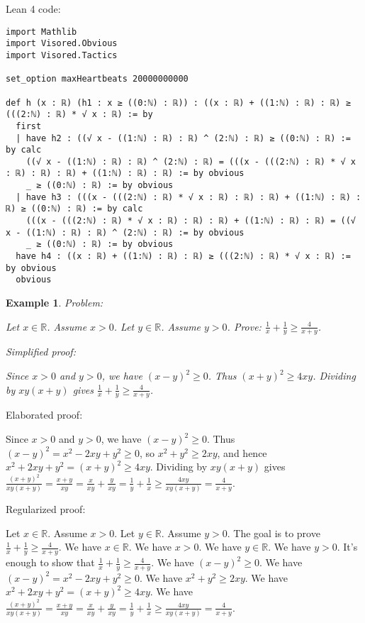 \documentclass{article}
\newtheorem{example}{Example}
\begin{document}
Lean 4 code:
\begin{tcolorbox}[colback=white!10, width=\linewidth]
\begin{lstlisting}[language=Lean4]
import Mathlib
import Visored.Obvious
import Visored.Tactics

set_option maxHeartbeats 20000000000

def h (x : ℝ) (h1 : x ≥ ((0:ℕ) : ℝ)) : ((x : ℝ) + ((1:ℕ) : ℝ) : ℝ) ≥ (((2:ℕ) : ℝ) * √ x : ℝ) := by
  first
  | have h2 : ((√ x - ((1:ℕ) : ℝ) : ℝ) ^ (2:ℕ) : ℝ) ≥ ((0:ℕ) : ℝ) := by calc
    ((√ x - ((1:ℕ) : ℝ) : ℝ) ^ (2:ℕ) : ℝ) = (((x - (((2:ℕ) : ℝ) * √ x : ℝ) : ℝ) : ℝ) + ((1:ℕ) : ℝ) : ℝ) := by obvious
    _ ≥ ((0:ℕ) : ℝ) := by obvious
  | have h3 : (((x - (((2:ℕ) : ℝ) * √ x : ℝ) : ℝ) : ℝ) + ((1:ℕ) : ℝ) : ℝ) ≥ ((0:ℕ) : ℝ) := by calc
    (((x - (((2:ℕ) : ℝ) * √ x : ℝ) : ℝ) : ℝ) + ((1:ℕ) : ℝ) : ℝ) = ((√ x - ((1:ℕ) : ℝ) : ℝ) ^ (2:ℕ) : ℝ) := by obvious
    _ ≥ ((0:ℕ) : ℝ) := by obvious
  have h4 : ((x : ℝ) + ((1:ℕ) : ℝ) : ℝ) ≥ (((2:ℕ) : ℝ) * √ x : ℝ) := by obvious
  obvious

\end{lstlisting}
\end{tcolorbox}


\begin{example}
Problem:
\begin{tcolorbox}[colback=yellow!10, width=\linewidth]
Let $x\in\mathbb{R}$. Assume $x>0$.
    Let $y\in\mathbb{R}$. Assume $y>0$.
    Prove: $\frac{1}{x} + \frac{1}{y} \ge \frac{4}{x+y}$.
\end{tcolorbox}

Simplified proof:
\begin{tcolorbox}[colback=blue!10, width=\linewidth]
Since $x>0$ and $y>0$, we have $(x-y)^2 \ge 0$. Thus $(x+y)^2 \ge 4xy$. Dividing by $xy(x+y)$ gives $\frac{1}{x}+\frac{1}{y} \ge \frac{4}{x+y}$.
\end{tcolorbox}
\end{example}

Elaborated proof:
\begin{tcolorbox}[colback=green!10, width=\linewidth]
Since $x>0$ and $y>0$, we have $(x-y)^2 \ge 0$. Thus $(x-y)^2 = x^2 -2xy + y^2 \ge 0$, so $x^2 + y^2 \ge 2xy$, and hence $x^2 + 2xy + y^2 = (x+y)^2 \ge 4xy$. Dividing by $xy(x+y)$ gives $\frac{(x+y)^2}{xy(x+y)} = \frac{x+y}{xy} = \frac{x}{xy} + \frac{y}{xy} = \frac{1}{y}+\frac{1}{x} \ge \frac{4xy}{xy(x+y)} = \frac{4}{x+y}$.
\end{tcolorbox}

Regularized proof:
\begin{tcolorbox}[colback=red!10, width=\linewidth]
Let $x\in\mathbb{R}$.
Assume $x>0$.
Let $y\in\mathbb{R}$.
Assume $y>0$.
The goal is to prove $\frac{1}{x} + \frac{1}{y} \ge \frac{4}{x+y}$.
We have $x \in \mathbb{R}$.
We have $x>0$.
We have $y \in \mathbb{R}$.
We have $y>0$.
It's enough to show that $\frac{1}{x} + \frac{1}{y} \ge \frac{4}{x+y}$.
We have ${(x-y)}^2 \ge 0$.
We have ${(x-y)}^2 = x^2 -2xy + y^2 \ge 0$.
We have $x^2 + y^2 \ge 2xy$.
We have $x^2 + 2xy + y^2 = {(x+y)}^2 \ge 4xy$.
We have $\frac{{(x+y)}^2}{xy(x+y)} = \frac{x+y}{xy} = \frac{x}{xy} + \frac{y}{xy} = \frac{1}{y}+\frac{1}{x} \ge \frac{4xy}{xy(x+y)} = \frac{4}{x+y}$.
\end{tcolorbox}
\end{document}
